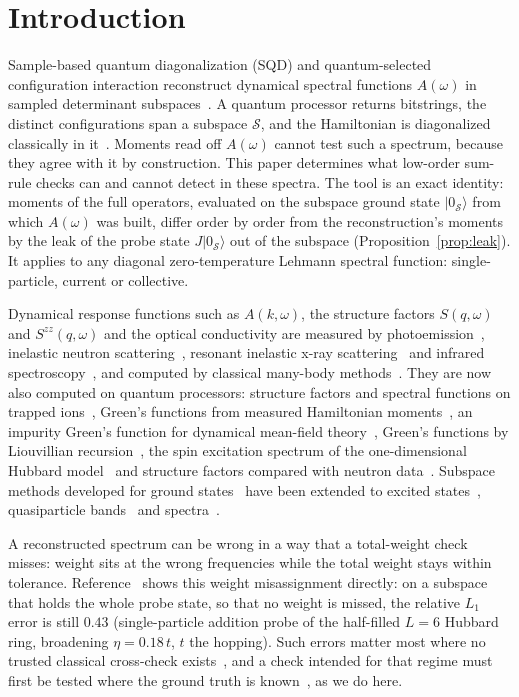 \documentclass[aps,prb,reprint,onecolumn,12pt,superscriptaddress,longbibliography,floatfix]{revtex4-2}
\begin{document}
\section{Introduction}
\label{sec:intro}

Sample-based quantum diagonalization (SQD) and quantum-selected configuration interaction reconstruct dynamical spectral functions $A(\omega)$ in sampled determinant subspaces~\cite{SQDspec2608,Patel2026}. A quantum processor returns bitstrings, the distinct configurations span a subspace $\mathcal S$, and the Hamiltonian is diagonalized classically in it~\cite{QSCI2023,SQDchem2025,SKQD2501}. Moments read off $A(\omega)$ cannot test such a spectrum, because they agree with it by construction. This paper determines what low-order sum-rule checks can and cannot detect in these spectra. The tool is an exact identity: moments of the full operators, evaluated on the subspace ground state $|0_\mathcal S\rangle$ from which $A(\omega)$ was built, differ order by order from the reconstruction's moments by the leak of the probe state $J|0_\mathcal S\rangle$ out of the subspace (Proposition~\ref{prop:leak}). It applies to any diagonal zero-temperature Lehmann spectral function: single-particle, current or collective.

Dynamical response functions such as $A(k,\omega)$, the structure factors $S(q,\omega)$ and $S^{zz}(q,\omega)$ and the optical conductivity are measured by photoemission~\cite{Damascelli2003}, inelastic neutron scattering~\cite{Lake2005}, resonant inelastic x-ray scattering~\cite{Ament2011} and infrared spectroscopy~\cite{Basov2011}, and computed by classical many-body methods~\cite{Benthien2004,Qin2022}. They are now also computed on quantum processors: structure factors and spectral functions on trapped ions~\cite{GranetDSF2026,GranetARPES2026}, Green's functions from measured Hamiltonian moments~\cite{GreeneDiniz2024}, an impurity Green's function for dynamical mean-field theory~\cite{Selisko2025}, Green's functions by Liouvillian recursion~\cite{Leblanc2026}, the spin excitation spectrum of the one-dimensional Hubbard model~\cite{VilchezEstevez2025} and structure factors compared with neutron data~\cite{Lee2026}. Subspace methods developed for ground states~\cite{QSCI2023,SQDchem2025,SKQD2501,Yoshioka2025,Motta2020} have been extended to excited states~\cite{Barison2024}, quasiparticle bands~\cite{Ohgoe2025} and spectra~\cite{SQDspec2608,Patel2026}.

A reconstructed spectrum can be wrong in a way that a total-weight check misses: weight sits at the wrong frequencies while the total weight stays within tolerance. Reference~\cite{SQDspec2608} shows this weight misassignment directly: on a subspace that holds the whole probe state, so that no weight is missed, the relative $L_1$ error is still $0.43$ (single-particle addition probe of the half-filled $L=6$ Hubbard ring, broadening $\eta=0.18\,t$, $t$ the hopping). Such errors matter most where no trusted classical cross-check exists~\cite{Preskill2018,Daley2022,Kim2023,Tindall2024}, and a check intended for that regime must first be tested where the ground truth is known~\cite{Eisert2020,Carrasco2021}, as we do here.
\end{document}
